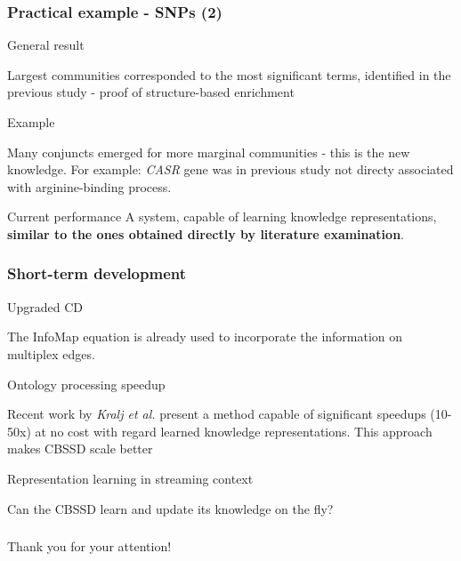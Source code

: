 \documentclass{beamer}
\begin{document}
  \begin{frame}\frametitle{Practical example - SNPs (2)}

    \begin{block}{General result}

      Largest communities corresponded to the most significant terms, identified in the previous study - proof of structure-based enrichment
      
    \end{block}

        \begin{exampleblock}{Example}

          Many conjuncts emerged for more marginal communities - this is the new knowledge.
          For example: \textit{CASR} gene was in previous study not directy associated with arginine-binding process.
      
        \end{exampleblock}

        \begin{block}{Current performance}
          A system, capable of learning knowledge representations, \textbf{similar to the ones obtained directly by literature examination}.
        \end{block}
       
      \end{frame}

      \begin{frame}\frametitle{Short-term development}

        \begin{block}{Upgraded CD}

          The InfoMap equation is already used to incorporate the information on multiplex edges.         
        \end{block}

        \begin{block}{Ontology processing speedup}

          Recent work by \textit{Kralj et al.} present a method capable of significant speedups (10-50x) at no cost with regard learned knowledge representations. This approach makes CBSSD scale better
        \end{block}

        \begin{block}{Representation learning in streaming context}

          Can the CBSSD learn and update its knowledge on the fly? 
          
          \end{block}
        
        \end{frame}

        
        \begin{frame}\frametitle{}

          \begin{center}
            Thank you for your attention!
          \end{center}
          
        \end{frame}
\end{document}
